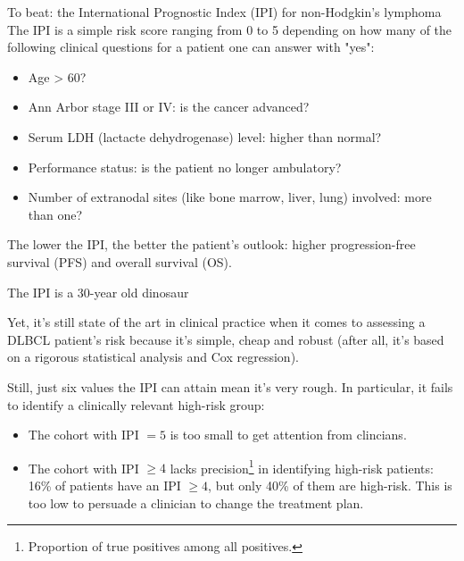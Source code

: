 \documentclass[10pt, aspectratio=169]{beamer}
\begin{document}
\begin{frame}{To beat: the International Prognostic Index (IPI) for non-Hodgkin's lymphoma}
  The IPI \autocite{ipi93} is a simple risk score ranging from 0 to 5 depending on how many of the following 
  \alert{clinical} questions for a patient one can answer with "yes": 

  \begin{itemize}
    \item Age > 60?
    \item Ann Arbor stage III or IV: is the cancer advanced?
    \item Serum LDH (lactacte dehydrogenase) level: higher than normal?
    \item Performance status: is the patient no longer ambulatory? 
    \item Number of extranodal sites (like bone marrow, liver, lung) involved: more than one?
  \end{itemize}

  \pause
  The lower the IPI, the better the patient's outlook: higher progression-free survival (PFS) and 
  overall survival (OS).
\end{frame}

\begin{frame}{The IPI is a 30-year old dinosaur}

  Yet, it's still state of the art in clinical practice when it comes to assessing a DLBCL 
  patient's risk  because it's \alert{simple}, \alert{cheap} and 
  \alert{robust} (after all, it's based on a rigorous statistical analysis and Cox regression).

  Still, just six values the IPI can attain mean it's very rough. In particular, it fails 
  to identify a clinically relevant high-risk group:

  \pause
  \begin{itemize}
    \item The cohort with IPI $= 5$ is \alert{too small} to get attention from clincians.
    \item The cohort with IPI $\geq 4$ \alert{lacks precision\footnote{Proportion of true 
      positives among all positives.} in identifying high-risk patients}: 16\% of patients have 
      an IPI $\geq 4$, but only 40\% of them are high-risk. This is too low to persuade 
      a clinician to change the treatment plan.
  \end{itemize}

\end{frame}
\end{document}
